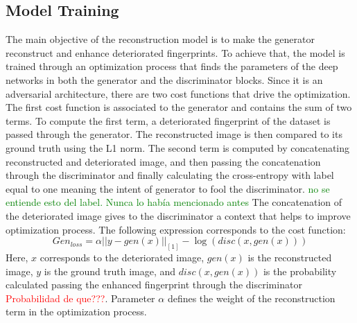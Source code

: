\documentclass[a4paper,fleqn]{cas-dc}
\begin{document}
\subsection{Model Training}
\label{sec:MT}
The main objective of the reconstruction model is to make the generator reconstruct and enhance deteriorated fingerprints. To achieve that, the model is trained through an optimization process that finds the parameters of the deep networks in both the generator and the discriminator blocks. Since it is an adversarial architecture, there are two cost functions that drive the optimization. The first cost function is associated to the generator and contains the sum of two terms. To compute the first term, a deteriorated fingerprint of the dataset is passed through the generator. The reconstructed image is then compared to its ground truth using the L1 norm. The second term is computed by concatenating reconstructed and deteriorated image, and then passing the concatenation through the discriminator and finally calculating the cross-entropy with label equal to one meaning the intent of generator to fool the discriminator. \textcolor{green}{no se entiende esto del label. Nunca lo había mencionado antes} The concatenation of the deteriorated image gives to the discriminator a context that helps to improve optimization process. The following expression corresponds to the cost function:
\begin{equation}
    Gen_{loss} = \alpha||y-gen(x)||_{[1]} - \log(disc(x,gen(x)))
\end{equation}
Here, $x$ corresponds to the deteriorated image, $gen(x)$ is the reconstructed image, $y$ is the ground truth image, and $disc(x,gen(x))$ is the probability calculated passing the enhanced fingerprint through the discriminator \textcolor{red}{Probabilidad de que???}. Parameter $\alpha$ defines the weight of the reconstruction term in the optimization process.
\end{document}
